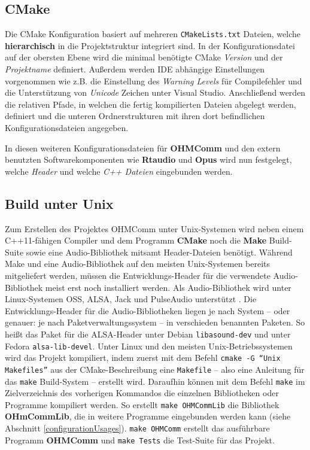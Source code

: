 \subsection{CMake}
Die CMake Konfiguration basiert auf mehreren \texttt{CMakeLists.txt} Dateien, welche \textbf{hierarchisch} in die Projektstruktur integriert sind. In der Konfigurationsdatei auf der obersten Ebene wird die minimal benötigte CMake \textit{Version} und der \textit{Projektname} definiert.
Außerdem werden IDE abhängige Einstellungen vorgenommen wie z.B. die Einstellung des \textit{Warning Levels} für Compilefehler und die Unterstützung von \textit{Unicode} Zeichen unter Visual Studio.
Anschließend werden die relativen Pfade, in welchen die fertig kompilierten Dateien abgelegt werden, definiert und die unteren Ordnerstrukturen mit ihren dort befindlichen Konfigurationsdateien angegeben.

In diesen weiteren Konfigurationsdateien für \textbf{OHMComm} und den extern benutzten Softwarekomponenten wie \textbf{Rtaudio} und \textbf{Opus} wird nun festgelegt, welche \textit{Header} und welche \textit{C++ Dateien} eingebunden werden. 

\subsection{Build unter Unix}
Zum Erstellen des Projektes OHMComm unter Unix-Systemen wird neben einem C++11-fähigen Compiler und dem Programm \textbf{CMake} noch die \textbf{Make} Build-Suite sowie eine Audio-Bibliothek mitsamt Header-Dateien benötigt. Während Make und eine Audio-Bibliothek auf den meisten Unix-Systemen bereits mitgeliefert werden, müssen die Entwicklungs-Header für die verwendete Audio-Bibliothek meist erst noch installiert werden. Als Audio-Bibliothek wird unter Linux-Systemen OSS, ALSA, Jack und PulseAudio unterstützt \cite{RTAudioAPIs}. Die Entwicklungs-Header für die Audio-Bibliotheken liegen je nach System -- oder genauer: je nach Paketverwaltungssystem -- in verschieden benannten Paketen. So heißt das Paket für die ALSA-Header unter Debian \texttt{libasound-dev} und unter Fedora \texttt{alsa-lib-devel}.
Unter Linux und den meisten Unix-Betriebssystemen wird das Projekt kompiliert, indem zuerst mit dem Befehl \texttt{cmake -G ``Unix Makefiles''} aus der CMake-Beschreibung eine \texttt{Makefile} -- also eine Anleitung für das \texttt{make} Build-System -- erstellt wird. Daraufhin können mit dem Befehl \texttt{make} im Zielverzeichnis des vorherigen Kommandos die einzelnen Bibliotheken oder Programme kompiliert werden. So erstellt \texttt{make OHMCommLib} die Bibliothek \textbf{OHmCommLib}, die in weitere Programme eingebunden werden kann (siehe Abschnitt \ref{configurationUsages}). \texttt{make OHMComm} erstellt das ausführbare Programm \textbf{OHMComm} und \texttt{make Tests} die Test-Suite für das Projekt.

